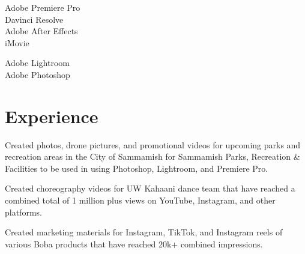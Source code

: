 \documentclass[]{main}
\begin{document}
\begin{minipage}[t]{0.33\textwidth}
\textbullet{} Adobe Premiere Pro \\
\textbullet{} Davinci Resolve \\
\textbullet{} Adobe After Effects \\
\textbullet{} iMovie


\sectionsep

\textbullet{} Adobe Lightroom \\
\textbullet{} Adobe Photoshop
\sectionsep

%
%

\end{minipage} 
\hfill
\begin{minipage}[t]{0.66\textwidth} 


\section{Experience}

\sectionsep

Created photos, drone pictures, and promotional videos for upcoming parks and recreation areas in the City of Sammamish for Sammamish Parks, Recreation \& Facilities to be used in using Photoshop, Lightroom, and Premiere Pro.

\sectionsep

\vspace{\topsep} 
Created choreography videos for UW Kahaani dance team that have reached a combined total of 1 million plus views on YouTube, Instagram, and other platforms.

\sectionsep

\vspace{\topsep}
Created marketing materials for Instagram, TikTok, and Instagram reels of various Boba products that have reached 20k+ combined impressions.

\sectionsep



\end{minipage}
\end{document}
